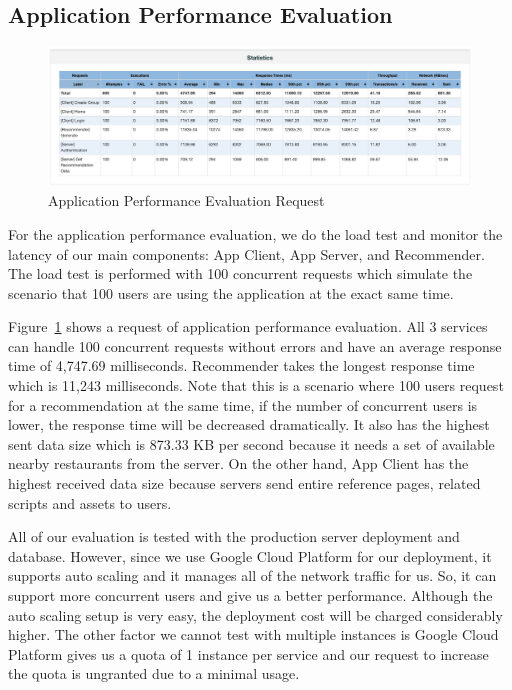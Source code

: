 \documentclass[12pt,oneside,openright,a4paper]{cpe-english-project}
\begin{document}
\subsection{Application Performance Evaluation}

\begin{figure}[H]\centering
\includegraphics[width=350pt]{./images/4ApplicationPerformanceEvaluationRequest.png}
\caption{Application Performance Evaluation Request}\label{fig:4ApplicationPerformanceEvaluationRequest}
\end{figure}

For the application performance evaluation, we do the load test and monitor the latency of our main components: App Client, App Server, and Recommender. The load test is performed with 100 concurrent requests which simulate the scenario that 100 users are using the application at the exact same time.

Figure~\ref{fig:4ApplicationPerformanceEvaluationRequest} shows a request of application performance evaluation. All 3 services can handle 100 concurrent requests without errors and have an average response time of 4,747.69 milliseconds. Recommender takes the longest response time which is 11,243 milliseconds. Note that this is a scenario where 100 users request for a recommendation at the same time, if the number of concurrent users is lower, the response time will be decreased dramatically. It also has the highest sent data size which is 873.33 KB per second because it needs a set of available nearby restaurants from the server. On the other hand, App Client has the highest received data size because servers send entire reference pages, related scripts and assets to users.

All of our evaluation is tested with the production server deployment and database. However, since we use Google Cloud Platform for our deployment, it supports auto scaling and it manages all of the network traffic for us. So, it can support more concurrent users and give us a better performance. Although the auto scaling setup is very easy, the deployment cost will be charged considerably higher. The other factor we cannot test with multiple instances is Google Cloud Platform gives us a quota of 1 instance per service and our request to increase the quota is ungranted due to a minimal usage.
\end{document}

